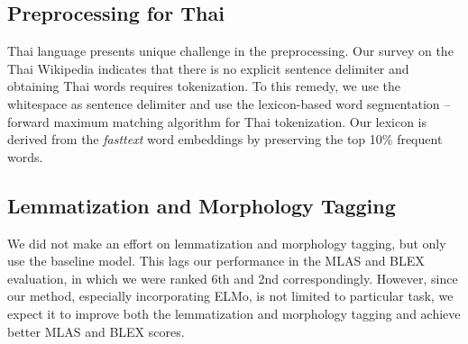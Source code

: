 \documentclass[11pt,a4paper]{article}
\begin{document}
\subsection{Preprocessing for Thai}

Thai language presents unique challenge in the preprocessing.
Our survey on the Thai Wikipedia indicates that there is no explicit sentence delimiter 
and obtaining Thai words requires tokenization.
To this remedy, we use the whitespace as sentence delimiter and
use the lexicon-based word segmentation -- forward maximum matching algorithm
for Thai tokenization.
Our lexicon is derived from the \textit{fasttext} word embeddings by preserving the top 10\% frequent words.

\subsection{Lemmatization and Morphology Tagging}
We did not make an effort on lemmatization and morphology tagging,
but only use the baseline model.
This lags our performance in the MLAS and BLEX evaluation,
in which we were ranked 6th and 2nd correspondingly.
However, since our method, especially incorporating ELMo, is not limited to particular task,
we expect it to improve both the lemmatization and morphology tagging and
achieve better MLAS and BLEX scores.
\end{document}
